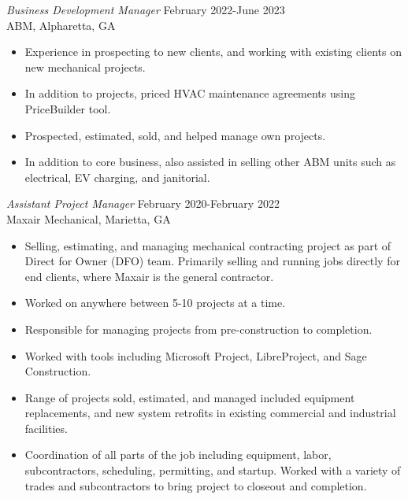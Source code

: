 \documentclass[margin]{res}
\begin{document}
\begin{resume}
    {\sl Business Development Manager} \hfill February 2022-June 2023 \\
            ABM, Alpharetta, GA
       \begin{itemize}  \itemsep -2pt
            \item Experience in prospecting to new clients, and working with existing clients on new mechanical projects.
            \item In addition to projects, priced HVAC maintenance agreements using PriceBuilder tool.
            \item Prospected, estimated, sold, and helped manage own projects.
            \item In addition to core business, also assisted in selling other ABM units such as electrical, EV charging, and janitorial.  
            \end{itemize}
            
    {\sl Assistant Project Manager} \hfill February 2020-February 2022 \\
 	    Maxair Mechanical, Marietta, GA
        \begin{itemize}  \itemsep -2pt %
            \item Selling, estimating, and managing mechanical contracting project as part of Direct for Owner (DFO) team. Primarily selling and running jobs directly for end clients, where Maxair is the general contractor.
            \item Worked on anywhere between 5-10 projects at a time.
            \item Responsible for managing projects from pre-construction to completion.
            \item Worked with tools including Microsoft Project, LibreProject, and Sage Construction.
            \item Range of projects sold, estimated, and managed included equipment replacements, and new system retrofits in existing commercial and industrial facilities.
            \item Coordination of all parts of the job including equipment, labor, subcontractors, scheduling, permitting, and startup. Worked with a variety of trades and subcontractors to bring project to closeout and completion.
            \end{itemize}


\end{resume}
\end{document}
